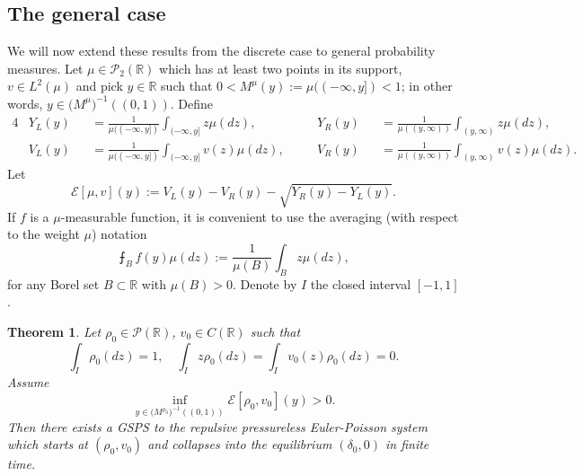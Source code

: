\documentclass[11pt]{article}
\newtheorem{theorem}{Theorem}[section]
\numberwithin{equation}{section}
\begin{document}
\subsection{The general case}
        We will now extend these results from the discrete case to general probability measures. Let $\mu\in\mathcal{P}_2(\mathbb{R})$ which has at least two points in its support, $v\in L^2(\mu)$ and pick $y\in\mathbb{R}$ such that $0<M^\mu(y):=\mu((-\infty,y])<1$; in other words, $y\in \big(M^{\mu}\big)^{-1}((0,1))$. Define 
        \begin{alignat*}{4}
            &Y_L(y)&&=\frac{1}{\mu((-\infty,y])}\int_{(-\infty,y]}z\mu(dz),\quad &&Y_R(y)&&=\frac{1}{\mu((y,\infty))}\int_{(y,\infty)}z\mu(dz),
            \\
            &V_L(y)&&=\frac{1}{\mu((-\infty,y])}\int_{(-\infty,y]}v(z)\mu(dz),\quad &&V_R(y)&&=\frac{1}{\mu((y,\infty))}\int_{(y,\infty)}v(z)\mu(dz).
        \end{alignat*}
        Let $$\mathcal{E}[\mu,v](y):=V_L(y)-V_R(y)-\sqrt{Y_R(y)-Y_L(y)}.$$ If $f$ is a $\mu$-measurable function, it is convenient to use the averaging (with respect to the weight $\mu$) notation
        $$\intbar_{B}f(y)\mu(dz):=\frac{1}{\mu(B)}\int_{B}z\mu(dz),$$
        for any Borel set $B\subset\mathbb{R}$ with $\mu(B)>0$.
        Denote by $I$ the closed interval $[-1,1]$. 
        \begin{theorem}\label{continuous-sufficient}
        Let $\rho_0\in\mathcal{P}(\mathbb{R})$, $v_0\in C(\mathbb{R})$ such that
        $$\int_I\rho_0(dz)=1,\quad \int_I z\rho_0(dz)=\int_Iv_0(z)\rho_0(dz)=0.$$ Assume 
        \begin{equation}\label{suff-assump}
        \inf_{y\in \big(M^{\rho_0}\big)^{-1}((0,1))}\mathcal{E}[\rho_0,v_0](y)>0.
        \end{equation}
        Then there exists a GSPS to the repulsive pressureless Euler-Poisson system which starts at $(\rho_0,v_0)$ and collapses into the equilibrium $(\delta_0,0)$ in finite time.
        \end{theorem}
\end{document}
